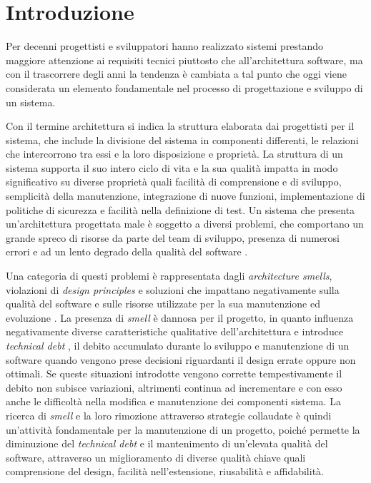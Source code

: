 \section{Introduzione}
    Per decenni progettisti e sviluppatori hanno realizzato sistemi prestando maggiore attenzione ai requisiti tecnici piuttosto che all'architettura software, ma con il trascorrere degli anni la tendenza è cambiata a tal punto che oggi viene considerata un elemento fondamentale nel processo di progettazione e sviluppo di un sistema.
    
    Con il termine architettura si indica la struttura elaborata dai progettisti per il sistema, che include la divisione del sistema in componenti differenti, le relazioni che intercorrono tra essi e la loro disposizione e proprietà.
    La struttura di un sistema supporta il suo intero ciclo di vita e la sua qualità impatta in modo significativo su diverse proprietà quali facilità di comprensione e di sviluppo, semplicità della manutenzione, integrazione di nuove funzioni, implementazione di politiche di sicurezza e facilità nella definizione di test.
    Un sistema che presenta un'architettura progettata male è soggetto a diversi problemi, che comportano un grande spreco di risorse da parte del team di sviluppo, presenza di numerosi errori e ad un lento degrado della qualità del software \cite{Arcan2017}. 
    
    Una categoria di questi problemi è rappresentata dagli \textit{architecture smells}, violazioni di \textit{design principles} e soluzioni che impattano negativamente sulla qualità del software e sulle risorse utilizzate per la sua manutenzione ed evoluzione \cite{AzadiFontana} \cite{Garcia2009}. La presenza di \textit{smell} è dannosa per il progetto, in quanto influenza negativamente diverse caratteristiche qualitative dell'architettura e introduce \textit{technical debt} \cite{SURYANARAYANA201521}, il debito accumulato durante lo sviluppo e manutenzione di un software quando vengono prese decisioni riguardanti il design errate oppure non ottimali. Se queste situazioni introdotte vengono corrette tempestivamente il debito non subisce variazioni, altrimenti continua ad incrementare e con esso anche le difficoltà nella modifica e manutenzione dei componenti sistema.
    La ricerca di \textit{smell} e la loro rimozione attraverso strategie collaudate è quindi un'attività fondamentale per la manutenzione di un progetto, poiché permette la diminuzione del \textit{technical debt} e il mantenimento di un'elevata qualità del software, attraverso un miglioramento di diverse qualità chiave quali comprensione del design, facilità nell'estensione, riusabilità e affidabilità.
    
